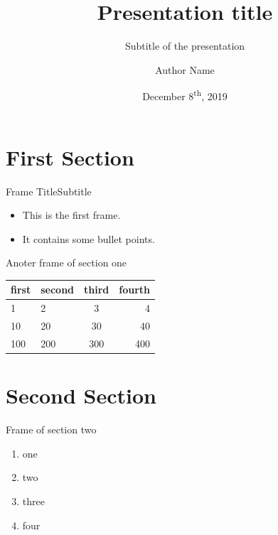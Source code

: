 \documentclass[
  english,            %
  aspectratio=169,    %
]{tumbeamer}
\title{Presentation title}
\subtitle{Subtitle of the presentation}
\author{Author Name}
\institute{\theChairName\\\theDepartmentName\\\theUniversityName}
\date[12/08/2019]{December 8\textsuperscript{th}, 2019}
\begin{document}
\maketitle

\section{First Section}
\begin{frame}{Frame Title}{Subtitle}
  \begin{itemize}
    \item This is the first frame.
    \item It contains some bullet points.
  \end{itemize}
\end{frame}

\begin{frame}{Anoter frame of section one}
  \centering
  \vfill
  \begin{tabular}{llcr}
    \toprule
    first & second & third & fourth \\
    \midrule
    1     & 2      & 3     & 4      \\
    10    & 20     & 30    & 40     \\
    100   & 200    & 300   & 400    \\
    \bottomrule
  \end{tabular}
  \vfill
\end{frame}

\section{Second Section}
\begin{frame}{Frame of section two}
  \begin{enumerate}
    \item one
    \item two
    \item three
    \item four
  \end{enumerate}
\end{frame}
\end{document}

